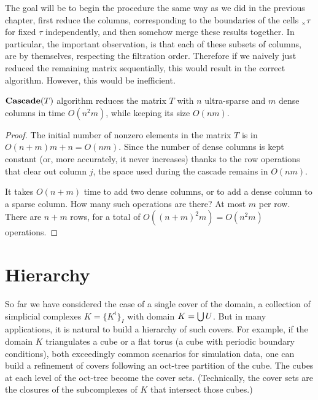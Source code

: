 The goal will be to begin the procedure the same way as we did in the previous chapter, first reduce the columns, corresponding to the boundaries of the cells $_ \times \tau$ for fixed $\tau$ independently, and then somehow merge these results together. In particular, the important observation, is that each of these subsets of columns, are by themselves, respecting the filtration order. Therefore if we naively just reduced the remaining matrix sequentially, this would result in the correct algorithm. However, this would be inefficient.



\begin{theorem}
    \label{thm:complexity}
    ${\bf Cascade}(T)$ algorithm reduces the matrix $T$ with $n$ ultra-sparse and
    $m$ dense columns in time $O(n^2 m)$, while keeping its size $O(nm)$.
\end{theorem}
\begin{proof}
    The initial number of nonzero elements in the matrix $T$ is in $O{(n + m) m + n} = O(nm)$.
    Since the number of dense columns is kept constant (or, more accurately, it
    never increases) thanks to the row operations that clear out column $j$, the
    space used during the cascade remains in $O(nm)$.

    It takes $O(n+m)$ time to add two dense columns, or to add a dense
    column to a sparse column. How many such operations are there?
    At most $m$ per row. There are $n+m$ rows, for a total of
    $O((n+m)^2 m) = O(n^2 m)$ operations.
\end{proof}



\section{Hierarchy}
\label{sec:hierarchy}

So far we have considered the case of a single cover of the domain, a collection
of simplicial complexes $K = \{ K^i \}_I$ with domain $K = \bigcup U$. But in many
applications, it is natural to build a hierarchy of such covers. For example, if
the domain $K$ triangulates a cube or a flat torus (a cube with periodic
boundary conditions), both exceedingly common scenarios for
simulation data, one can build a refinement of covers following an oct-tree
partition of the cube. The cubes at each level of the oct-tree become the cover
sets.
(Technically, the cover sets are the closures of the subcomplexes of $K$ that
intersect those cubes.)

